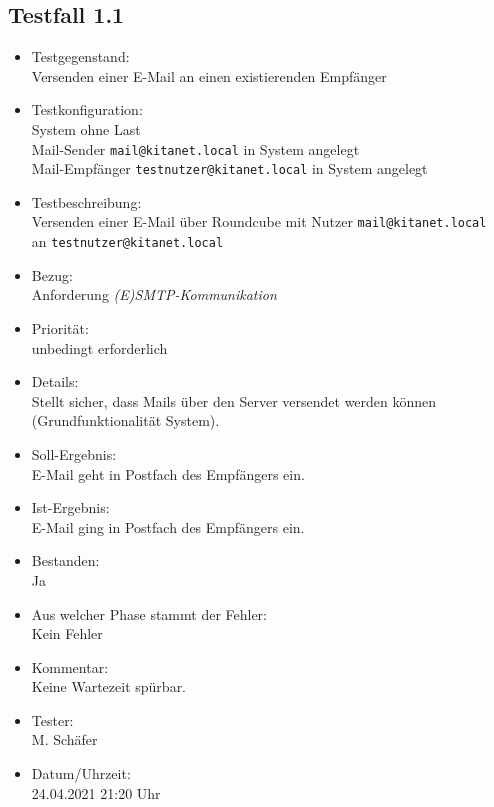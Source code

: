 \subsection{Testfall 1.1}
\begin{itemize}
	\item Testgegenstand:\\
	Versenden einer E-Mail an einen existierenden Empfänger
	\item Testkonfiguration:\\
	System ohne Last\\
	Mail-Sender \verb+mail@kitanet.local+ in System angelegt\\
	Mail-Empfänger \verb+testnutzer@kitanet.local+ in System angelegt
	\item Testbeschreibung:\\
	Versenden einer E-Mail über Roundcube mit Nutzer \verb+mail@kitanet.local+ \\ an \verb+testnutzer@kitanet.local+
	\item Bezug:\\
	Anforderung \textit{(E)SMTP-Kommunikation}
	\item Priorität:\\
	unbedingt erforderlich
	\item Details:\\
	Stellt sicher, dass Mails über den Server versendet werden können (Grundfunktionalität System).
	\item Soll-Ergebnis:\\
	E-Mail geht in Postfach des Empfängers ein.
	\item Ist-Ergebnis:\\
	E-Mail ging in Postfach des Empfängers ein.
	\item Bestanden:\\
	Ja
	\item Aus welcher Phase stammt der Fehler:\\
	Kein Fehler
	\item Kommentar:\\
	Keine Wartezeit spürbar.
	\item Tester:\\
	M. Schäfer
	\item Datum/Uhrzeit:\\
	24.04.2021 21:20 Uhr
\end{itemize}


